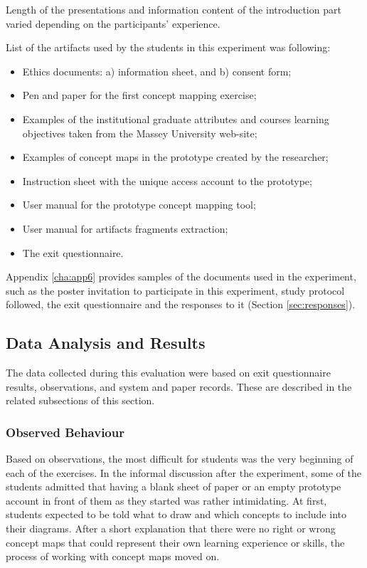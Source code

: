 \FloatBarrier

Length of the presentations and information content of the introduction part
varied depending on the participants' experience.

List of the artifacts used by the students in this experiment was following:

\begin{itemize}
  \item Ethics documents: a) information sheet, and b) consent form;
  \item Pen and paper for the first concept mapping exercise;
  \item Examples of the institutional graduate attributes and courses learning
  objectives taken from the Massey University web-site;
  \item Examples of concept maps in the prototype created by the researcher;
  \item Instruction sheet with the unique access account to the prototype;
  \item User manual for the prototype concept mapping tool;
  \item User manual for artifacts fragments extraction;
  \item The exit questionnaire.
\end{itemize} 

Appendix \ref{cha:app6} provides samples of the documents used in the
experiment, such as the poster invitation to participate in this experiment,
study protocol followed, the exit questionnaire and the responses to it (Section
\ref{sec:responses}).

\subsection{Data Analysis and Results}

The data collected during this evaluation were based on exit questionnaire
results, observations, and system and paper records. These are described in the
related subsections of this section.

\subsubsection{Observed Behaviour}

Based on observations, the most difficult for students was the very beginning of
each of the exercises. In the informal discussion after the experiment, some
of the students admitted that having a blank sheet of paper or an empty
prototype account in front of them as they started was rather intimidating. At
first, students expected to be told what to draw and which concepts to include
into their diagrams. After a short explanation that there were no right or wrong
concept maps that could represent their own learning experience or skills, the
process of working with concept maps moved on.

